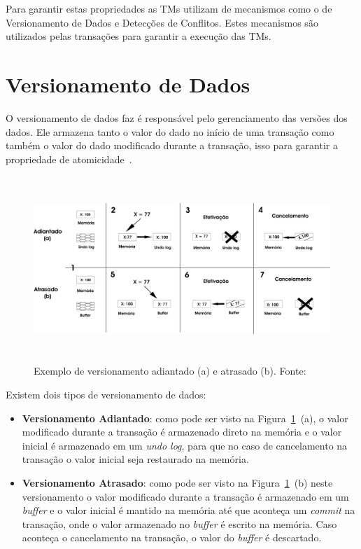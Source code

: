 \documentclass[diss,capa]{texufpel}
\begin{document}
Para garantir estas propriedades as TMs utilizam de mecanismos como o de Versionamento de Dados e Detecções de Conflitos. Estes mecanismos são utilizados pelas transações para garantir a execução das TMs.

\section{Versionamento de Dados}

O versionamento de dados faz é responsável pelo gerenciamento das versões dos dados. Ele armazena tanto o valor do dado no início de uma transação como também o valor do dado modificado durante a transação, isso para garantir a propriedade de atomicidade~\cite{BaldassinTese2009}.

\begin{figure}[!htp]
\centering
\includegraphics[height=7cm]{images/versionamento.png}
\caption{Exemplo de versionamento adiantado (a) e atrasado (b). Fonte:~\cite{BaldassinTese2009}}
\label{figuraversionamento}
\end{figure}

Existem dois tipos de versionamento de dados:

\begin{itemize}
 \item \textbf{Versionamento Adiantado}: como pode ser visto na Figura~\ref{figuraversionamento}~(a), o valor modificado durante a transação é armazenado direto na memória e o valor inicial é armazenado em um \emph{undo log}, para que no caso de cancelamento na transação o valor inicial seja restaurado na memória.

 \item \textbf{Versionamento Atrasado}: como pode ser visto na Figura~\ref{figuraversionamento}~(b) neste versionamento o valor modificado durante a transação é armazenado em um \emph{buffer} e o valor inicial é mantido na memória até que aconteça um \emph{commit} na transação, onde o valor armazenado no \emph{buffer} é escrito na memória. Caso aconteça o cancelamento na transação, o valor do \emph{buffer} é descartado.
\end{itemize}
\end{document}
